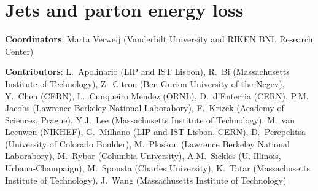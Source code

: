 \documentclass[../report.tex]{subfiles}
\providecommand{\main}{..}
\begin{document}
\section{Jets and parton energy loss}\label{sec:HI_Jets}

{ \small
  \noindent \textbf{Coordinators}: Marta Verweij (Vanderbilt University and RIKEN BNL Research Center)
  
  \noindent \textbf{Contributors}:
L.~Apolinario (LIP and IST Lisbon),
R.~Bi (Massachusetts Institute of Technology),
Z.~Citron (Ben-Gurion University of the Negev),
Y.~Chen (CERN),
L.~Cunqueiro Mendez (ORNL),
D.~d'Enterria (CERN),
P.M. Jacobs (Lawrence Berkeley National Laborabory),
F.~Krizek (Academy of Sciences, Prague),
Y.J.~Lee (Massachusetts Institute of Technology),
M.~van Leeuwen (NIKHEF),
G.~Milhano (LIP and IST Lisbon, CERN),
D.~Perepelitsa (University of Colorado Boulder),
M.~Ploskon (Lawrence Berkeley National Laborabory),
M.~Rybar (Columbia University),
A.M.~Sickles (U. Illinois, Urbana-Champaign),
M.~Spousta (Charles University),
K.~Tatar (Massachusetts Institute of Technology),
J.~Wang (Massachusetts Institute of Technology)
}



\newpage

\newpage

\newpage

%
\end{document}
